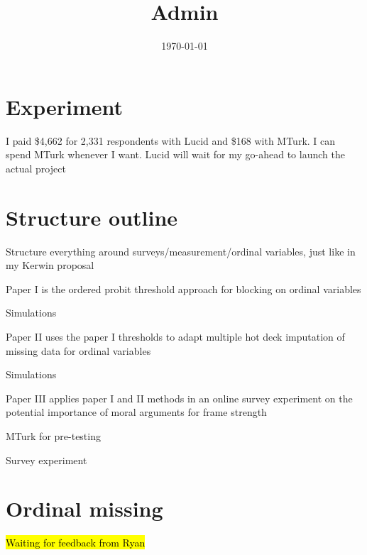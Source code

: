 \documentclass[12pt]{article}
\title{Admin}
\date{\today}
\begin{document}
\maketitle


\section*{Experiment}
	\begin{coi}
		\item I paid \$4,662 for 2,331 respondents with Lucid and \$168 with MTurk. I can spend MTurk whenever I want. Lucid will wait for my go-ahead to launch the actual project
	\end{coi}	
	
\section*{Structure outline}
	\begin{coi}
		\item Structure everything around surveys/measurement/ordinal variables, just like in my Kerwin proposal
		\item Paper I is the ordered probit threshold approach for blocking on ordinal variables
			\begin{coi}
				\item Simulations
			\end{coi}
		\item Paper II uses the paper I thresholds to adapt multiple hot deck imputation of missing data for ordinal variables
			\begin{coi}
				\item Simulations
			\end{coi}
		\item Paper III applies paper I and II methods in an online survey experiment on the potential importance of moral arguments for frame strength
			\begin{coi}
				\item MTurk for pre-testing
				\item Survey experiment
			\end{coi}
	\end{coi}


\section*{Ordinal missing}
	\begin{coi}
		\item \hl{Waiting for feedback from Ryan}
	\end{coi}
	
\end{document}
